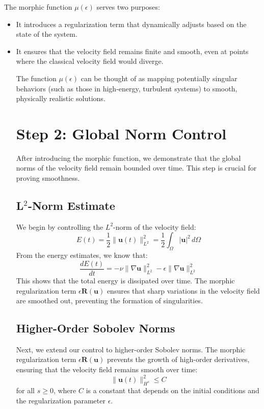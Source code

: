 \documentclass{article}
\begin{document}
The morphic function \( \mu(\epsilon) \) serves two purposes:
\begin{itemize}
    \item It introduces a regularization term that dynamically adjusts based on the state of the system.
    \item It ensures that the velocity field remains finite and smooth, even at points where the classical velocity field would diverge.

The function \( \mu(\epsilon) \) can be thought of as mapping potentially singular behaviors (such as those in high-energy, turbulent systems) to smooth, physically realistic solutions.

\section*{Step 2: Global Norm Control}

After introducing the morphic function, we demonstrate that the global norms of the velocity field remain bounded over time. This step is crucial for proving smoothness.

\subsection*{L\(^2\)-Norm Estimate}

We begin by controlling the \( L^2 \)-norm of the velocity field:
\[
E(t) = \frac{1}{2} \|\mathbf{u}(t)\|_{L^2}^2 = \frac{1}{2} \int_{\Omega} |\mathbf{u}|^2 \, d\Omega
\]
From the energy estimates, we know that:
\[
\frac{dE(t)}{dt} = -\nu \|\nabla \mathbf{u}\|_{L^2}^2 - \epsilon \|\nabla \mathbf{u}\|_{L^2}^2
\]
This shows that the total energy is dissipated over time. The morphic regularization term \( \epsilon \mathbf{R}(\mathbf{u}) \) ensures that sharp variations in the velocity field are smoothed out, preventing the formation of singularities.

\subsection*{Higher-Order Sobolev Norms}

Next, we extend our control to higher-order Sobolev norms. The morphic regularization term \( \epsilon \mathbf{R}(\mathbf{u}) \) prevents the growth of high-order derivatives, ensuring that the velocity field remains smooth over time:
\[
\|\mathbf{u}(t)\|_{H^s}^2 \leq C
\]
for all \( s \geq 0 \), where \( C \) is a constant that depends on the initial conditions and the regularization parameter \( \epsilon \).


\end{itemize}
\end{document}
